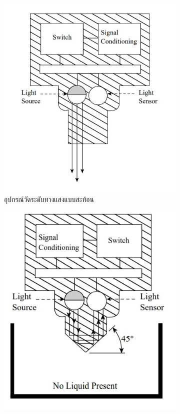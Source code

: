 \documentclass[final,11pt]{article}
\begin{document}
\begin{figure}
    \begin{subfigure}[b]{0.4\textwidth}
        \centering
        \includegraphics[width=\textwidth]{images/Screenshot_23.jpg}
        \caption{อุปกรณ์วัดระดับทางแสงแบบสะท้อน}
        \label{fig:ols1}
    \end{subfigure}
    \hfill
    \begin{subfigure}[b]{0.35\textwidth}
        \centering
        \includegraphics[width=\textwidth]{images/Screenshot_7.jpg}

\end{subfigure}
\end{figure}
\end{document}

